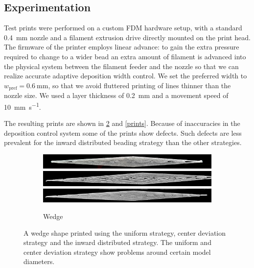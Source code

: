 \subsection{Experimentation}
Test prints were performed on a custom FDM hardware setup, with a standard \SI{0.4}{\milli\meter} nozzle and a filament extrusion drive directly mounted on the print head.
The firmware of the printer employs linear advance: to gain the extra pressure required to change to a wider bead an extra amount of filament is advanced into the physical system between the filament feeder and the nozzle so that we can realize accurate adaptive deposition width control.\cite{tronvoll2019investigating}
We set the preferred width to $w_\text{pref} = \SI{0.6}{\milli\meter}$, so that we avoid fluttered printing of lines thinner than the nozzle size.
We used a layer thickness of \SI{0.2}{\milli\meter} and a movement speed of \SI{10}{\milli\meter\per\second}.

The resulting prints are shown in \cref{wedge_print} and \cref{prints}.
Because of inaccuracies in the deposition control system some of the prints show defects.
Such defects are less prevalent for the inward distributed beading strategy than the other strategies.


\begin{figure}
\centering
\begin{subfigure}{\columnwidth}\centering
\setlength{\figwidth}{\columnwidth}
\includegraphics[width=\figwidth]{sources/applications/P3_print_wedge_naive_edited.png}
\includegraphics[width=\figwidth]{sources/applications/P3_print_wedge_center_edited.png}
\includegraphics[width=\figwidth]{sources/applications/P3_print_wedge_inward_edited.png}
\caption{Wedge}\label{print_wedge}
\end{subfigure}
\caption{
A wedge shape printed using the uniform strategy, center deviation strategy and the inward distributed strategy.
The uniform and center deviation strategy show problems around certain model diameters.
}
\label{wedge_print}
\end{figure}

